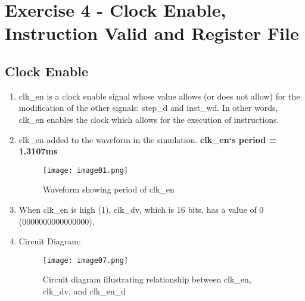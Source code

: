 \documentclass{article}
\begin{document}

\section*{Exercise 4 - Clock Enable, Instruction Valid and Register File}
\subsection*{Clock Enable}

 \begin{enumerate}[label=\arabic*),ref=\arabic*]
   \item clk\_en is a clock enable signal whose value allows (or does not allow) for the modification of the other signals: step\_d and inst\_wd.  In other words, clk\_en enables the clock which allows for the execution of instructions.
   \item clk\_en added to the waveform in the simulation.  \textbf{clk\_en`s period = 1.3107ms}
   
   \begin{figure}[H]
   \begin{center}
\texttt{[image: image01.png]} 
\caption{Waveform showing period of clk\_en}
\end{center}
\end{figure}

\item When clk\_en is high (1), clk\_dv, which is 16 bits, has a value of 0 (0000000000000000).

\item Circuit Diagram:
\begin{figure}[H]
\begin{center}
\texttt{[image: image07.png]} 
\caption{Circuit diagram illustrating relationship between clk\_en, clk\_dv, and clk\_en\_d}
\end{center}
\end{figure}
  \end{enumerate}
\end{document}
